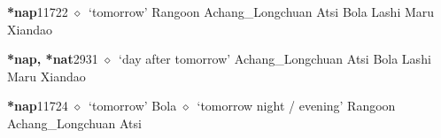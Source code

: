   \begin{list}{}{\leftmargin=1.5em \itemindent=-1.5em}
  \item {\footnotesize \textbf{*nap}}{\tiny 11722}
         $\diamond$~`tomorrow'
         Rangoon 
\hspace{1ex}
         Achang\_Longchuan 
\hspace{1ex}
         Atsi 
\hspace{1ex}
         Bola 
\hspace{1ex}
         Lashi 
\hspace{1ex}
         Maru 
\hspace{1ex}
         Xiandao 
  \item {\footnotesize \textbf{*nap, *nat}}{\tiny 2931}
\hspace{1ex}
         $\diamond$~`day after tomorrow'
         Achang\_Longchuan 
\hspace{1ex}
         Atsi 
\hspace{1ex}
         Bola 
\hspace{1ex}
         Lashi 
\hspace{1ex}
         Maru 
\hspace{1ex}
         Xiandao 
  \item {\footnotesize \textbf{*nap}}{\tiny 11724}
\hspace{1ex}
         $\diamond$~`tomorrow'
         Bola 
\hspace{1ex}
         $\diamond$~`tomorrow night / evening'
         Rangoon 
\hspace{1ex}
         Achang\_Longchuan 
\hspace{1ex}
         Atsi 

\end{list}
